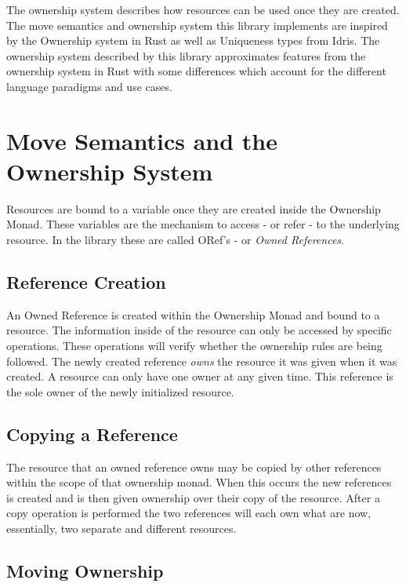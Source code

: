 \documentclass[onehalf,11pt]{beavtex}
\begin{document}
The ownership system describes how resources can be used once they are created.
The move semantics and ownership system this library implements are inspired by
the Ownership system in Rust as well as Uniqueness types from Idris.
\cite{rust_book_ownership} \cite{idris_uniqueness_types}
The ownership system described by this library approximates features from the
ownership system in Rust with some differences which account for the different
language paradigms and use cases.

\section{Move Semantics and the Ownership System}

Resources are bound to a variable once they are created inside the Ownership
Monad.  These variables are the mechanism to access - or refer - to the
underlying resource.  In the library these are called ORef's -
or \textit{Owned References}.

\subsection{Reference Creation}

An Owned Reference is created within the Ownership Monad and bound to a
resource.
The information inside of the resource can only be accessed by specific
operations.  These operations will verify whether the ownership rules are being
followed. The newly created reference \textit{owns} the resource it was given
when it was created. A resource can only have one owner at any given time.
This reference is the sole owner of the newly initialized resource. 

\subsection{Copying a Reference}

The resource that an owned reference owns may be copied by other references
within the scope of that ownership monad.  When this occurs the new references is
created and is then given ownership over their copy of the resource.  After a
copy operation is performed the two references will each own what are now,
essentially, two separate and different resources.

\subsection{Moving Ownership}
\end{document}
